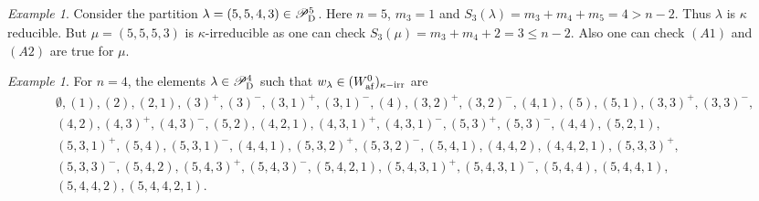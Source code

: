 \documentclass[a4paper]{amsart}
\theoremstyle{remark}
\newtheorem{example}[thm]{Example}
\numberwithin{equation}{section}
\begin{document}
\begin{example}
 Consider the partition $\lambda=(5,5,4,3)\in \mathscr{P}^5_{\mathrm{D}_{}}$.  Here $n=5$, $m_3=1$ and $S_3(\lambda)=m_3+m_4+m_5=4>n-2$. Thus $\lambda$ is $\kappa$ reducible. But $\mu=(5,5,5,3)$ is $\kappa$-irreducible as one can check $S_3(\mu)=m_3+m_4+2=3\leq n-2$. Also one can check $(A1)$ and $(A2)$ are true for $\mu$.  
\end{example}



























































\begin{example}
For $n=4$, the elements $\lambda\in \mathscr{P}^4_{\mathrm{D}_{}}$ such that $w_\lambda\in ({{W}}_{\mathrm{af}}^0)_{\kappa-\text{irr}}$ 
are 
\begin{align*}
&\emptyset, (1), (2), (2,1), (3)^+, (3)^-, (3,1)^{+}, (3,1)^{-}, (4), (3,2)^+, (3,2)^-, (4,1), (5), (5,1),(3,3)^+, (3,3)^-,\\& (4,2), (4,3)^+,(4,3)^-, (5,2), (4,2,1),(4,3,1)^+, (4,3,1)^-,(5,3)^+,(5,3)^-,(4,4),(5,2,1),\\ & (5,3,1)^+,(5,4),(5,3,1)^-,(4,4,1), (5,3,2)^+,(5,3,2)^-,(5,4,1),(4,4,2), (4,4,2,1), (5,3,3)^+, \\&(5,3,3)^-, (5,4,2), (5,4,3)^+, (5,4,3)^-, (5,4,2,1), (5,4,3,1)^+, (5,4,3,1)^-,(5,4,4), (5,4,4,1),\\& (5,4,4,2),(5,4,4,2,1).\end{align*}
\end{example}
\end{document}
